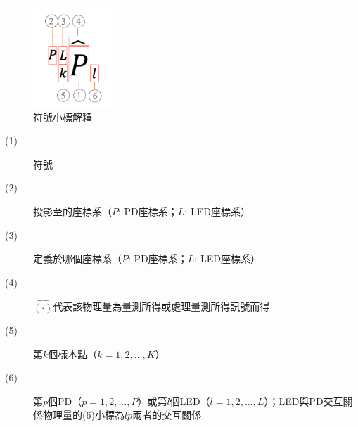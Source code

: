 \begin{figure}[ht]
	\centering
	\includegraphics[width=3cm]{ch1pic/not_whole.png}
    \caption{符號小標解釋}
    \label{pic:not_whole}
\end{figure}

\begin{description}
    \item[(1)] 符號
    \item[(2)] 投影至的座標系（$P$: PD座標系；$L$: LED座標系）
    \item[(3)] 定義於哪個座標系（$P$: PD座標系；$L$: LED座標系）
    \item[(4)] $\hat{(\cdot)}$代表該物理量為量測所得或處理量測所得訊號而得
    \item[(5)] 第$k$個樣本點（$k=1,2,...,K$）
    \item[(6)] 第$p$個PD（$p=1,2,...,P$）或第$l$個LED（$l=1,2,...,L$）；LED與PD交互關係物理量的(6)小標為$lp$兩者的交互關係
\end{description}